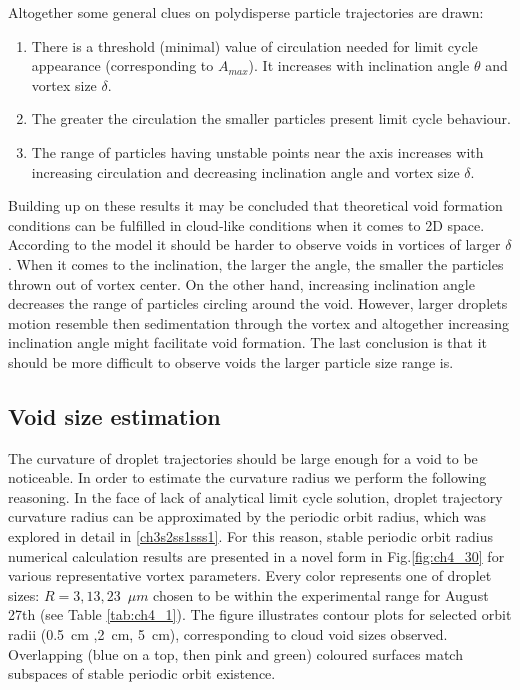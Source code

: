 \documentclass[../main.tex]{subfiles}
\begin{document}
Altogether some general clues on polydisperse particle trajectories are drawn:
\begin{enumerate}
\item There is a threshold (minimal) value of circulation needed for limit cycle appearance (corresponding to $A_{max}$). It increases with inclination angle $\theta$ and vortex size $\delta$.
\item The greater the circulation the smaller particles present limit cycle behaviour.
\item The range of particles having unstable points near the axis increases with increasing circulation and decreasing inclination angle and vortex size $\delta$.
\end{enumerate}

\noindent Building up on these results it may be concluded that theoretical void formation conditions can be fulfilled in cloud-like conditions when it comes to 2D space. According to the model it should be harder to observe voids in vortices of larger $\delta$. When it comes to the inclination, the larger the angle, the smaller the particles thrown out of vortex center. On the other hand, increasing inclination angle decreases the range of particles circling around the void. However, larger droplets motion resemble then sedimentation through the vortex and altogether increasing inclination angle might facilitate void formation. The last conclusion is that it should be more difficult to observe voids the larger particle size range is.\\

\subsection{Void size estimation}
\label{ssec:par}
The curvature of droplet trajectories should be large enough for a void to be noticeable. In order to estimate the curvature radius we perform the following reasoning. In the face of lack of analytical limit cycle solution, droplet trajectory curvature radius can be approximated by the periodic orbit radius, which was explored in detail in \autoref{ch3s2ss1sss1}. For this reason, stable periodic orbit radius numerical calculation results are presented in a novel form in Fig.\ref{fig:ch4_30} for various representative vortex parameters. Every color represents one of droplet sizes: $R=3,13,23$~$\mu m$ chosen to be within the experimental range for August 27th (see Table \ref{tab:ch4_1}). The figure illustrates contour plots for selected orbit radii (0.5~cm ,2~cm, 5~cm), corresponding to cloud void sizes observed. Overlapping (blue on a top, then pink and green) coloured surfaces match subspaces of stable periodic orbit existence. 
\end{document}
